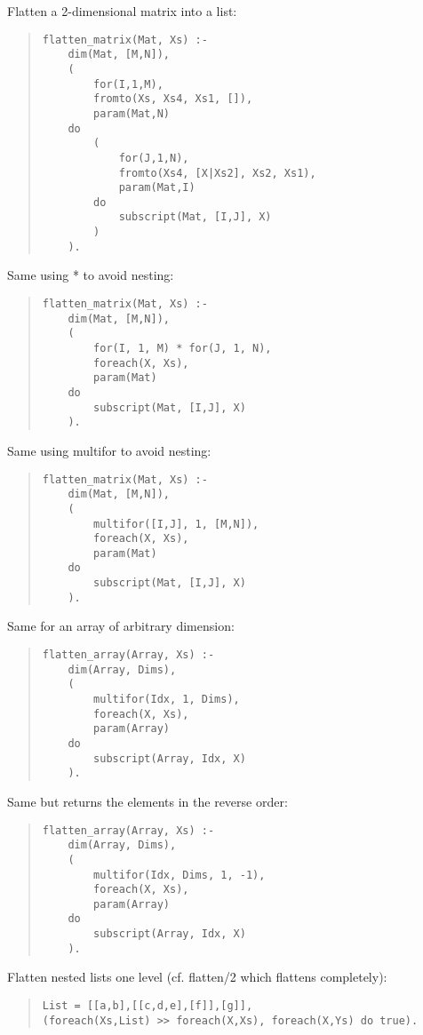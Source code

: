 Flatten a 2-dimensional matrix into a list:
\begin{quote}\begin{verbatim}
flatten_matrix(Mat, Xs) :-
    dim(Mat, [M,N]),
    (
        for(I,1,M),
        fromto(Xs, Xs4, Xs1, []),
        param(Mat,N)
    do
        (
            for(J,1,N),
            fromto(Xs4, [X|Xs2], Xs2, Xs1),
            param(Mat,I)
        do
            subscript(Mat, [I,J], X)
        )
    ).
\end{verbatim}\end{quote}

Same using * to avoid nesting:
\begin{quote}\begin{verbatim}
flatten_matrix(Mat, Xs) :-
    dim(Mat, [M,N]),
    (
        for(I, 1, M) * for(J, 1, N),
        foreach(X, Xs),
        param(Mat)
    do
        subscript(Mat, [I,J], X)
    ).
\end{verbatim}\end{quote}

Same using multifor to avoid nesting:
\begin{quote}\begin{verbatim}
flatten_matrix(Mat, Xs) :-
    dim(Mat, [M,N]),
    (
        multifor([I,J], 1, [M,N]),
        foreach(X, Xs),
        param(Mat)
    do
        subscript(Mat, [I,J], X)
    ).
\end{verbatim}\end{quote}

Same for an array of arbitrary dimension:
\begin{quote}\begin{verbatim}
flatten_array(Array, Xs) :-
    dim(Array, Dims),
    (
        multifor(Idx, 1, Dims),
        foreach(X, Xs),
        param(Array)
    do
        subscript(Array, Idx, X)
    ).
\end{verbatim}\end{quote}

Same but returns the elements in the reverse order:
\begin{quote}\begin{verbatim}
flatten_array(Array, Xs) :-
    dim(Array, Dims),
    (
        multifor(Idx, Dims, 1, -1),
        foreach(X, Xs),
        param(Array)
    do
        subscript(Array, Idx, X)
    ).
\end{verbatim}\end{quote}

Flatten nested lists one level (cf. flatten/2 which flattens completely):
\begin{quote}\begin{verbatim}
List = [[a,b],[[c,d,e],[f]],[g]],
(foreach(Xs,List) >> foreach(X,Xs), foreach(X,Ys) do true).
\end{verbatim}\end{quote}

